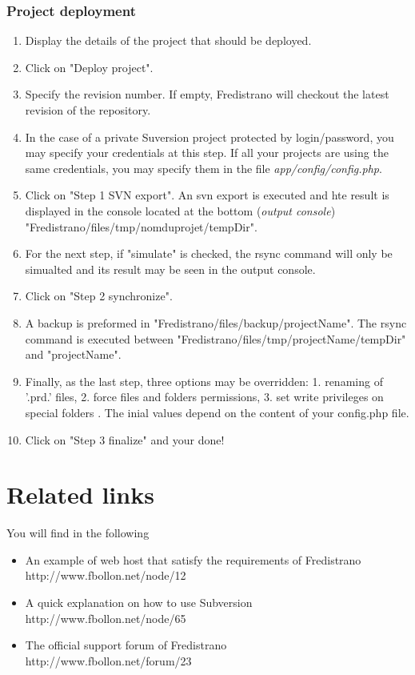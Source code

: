\documentclass[12pt,a4paper]{report}
\begin{document}
\subsection{Project deployment}
\begin{enumerate}
\item Display the details of the project that should be deployed.
\item Click on "Deploy project".
\item Specify the revision number. If empty, Fredistrano will checkout the latest revision of the repository.
\item In the case of a private Suversion project protected by login/password, you may specify your credentials at this step. If all your projects are using the same credentials, you may specify them in the file \textit{app/config/config.php}.
\item Click on "Step 1 SVN export". An svn export is executed and hte result is displayed in the console located at the bottom (\textit{output console}) "Fredistrano/files/tmp/nomduprojet/tempDir".
\item For the next step, if "simulate" is checked, the rsync command will only be simualted and its  result may be seen in the output console.
\item Click on "Step 2 synchronize".
\item A backup is preformed in "Fredistrano/files/backup/projectName". The rsync command is executed between "Fredistrano/files/tmp/projectName/tempDir" and "projectName".
\item Finally, as the last step, three options may be overridden: 1. renaming of '.prd.' files, 2. force files and folders permissions, 3. set write privileges on special folders . The inial values depend on the content of your config.php file.
\item Click on "Step 3 finalize" and your done!
\end{enumerate}

\chapter{Related links}
You will find in the following 
\begin{itemize}
\item An example of web host that satisfy the requirements of Fredistrano \\ http://www.fbollon.net/node/12 \\
\item A quick explanation on how to use Subversion \\ http://www.fbollon.net/node/65 \\
\item The official support forum of Fredistrano \\ http://www.fbollon.net/forum/23
\end{itemize}
\end{document}

